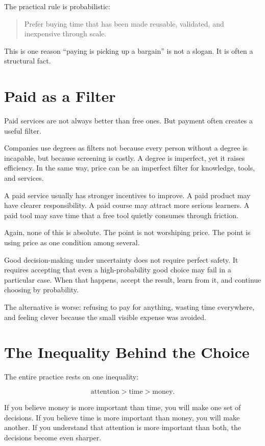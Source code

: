 The practical rule is probabilistic:

\begin{quote}
Prefer buying time that has been made reusable, validated, and inexpensive through scale.
\end{quote}

This is one reason ``paying is picking up a bargain'' is not a slogan. It is often a structural fact.

\section*{Paid as a Filter}

Paid services are not always better than free ones. But payment often creates a useful filter.

Companies use degrees as filters not because every person without a degree is incapable, but because screening is costly. A degree is imperfect, yet it raises efficiency. In the same way, price can be an imperfect filter for knowledge, tools, and services.

A paid service usually has stronger incentives to improve. A paid product may have clearer responsibility. A paid course may attract more serious learners. A paid tool may save time that a free tool quietly consumes through friction.

Again, none of this is absolute. The point is not worshiping price. The point is using price as one condition among several.

Good decision-making under uncertainty does not require perfect safety. It requires accepting that even a high-probability good choice may fail in a particular case. When that happens, accept the result, learn from it, and continue choosing by probability.

The alternative is worse: refusing to pay for anything, wasting time everywhere, and feeling clever because the small visible expense was avoided.

\section*{The Inequality Behind the Choice}

The entire practice rests on one inequality:

\[
\text{attention} > \text{time} > \text{money}.
\]

If you believe money is more important than time, you will make one set of decisions. If you believe time is more important than money, you will make another. If you understand that attention is more important than both, the decisions become even sharper.

